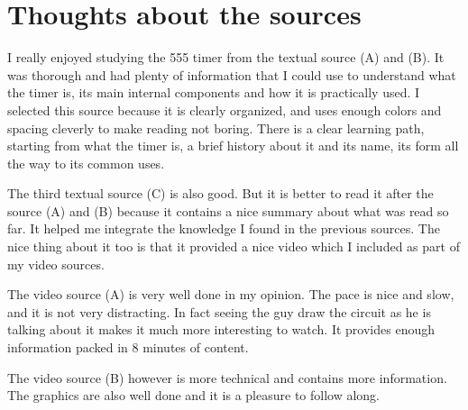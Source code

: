 \documentclass[12pt]{extarticle}
\begin{document}
\section{Thoughts about the sources}

I really enjoyed studying the 555 timer from the textual source (A) and (B). It was thorough and had plenty of information that I could use to understand what the timer is, its main internal components and how it is practically used. I selected this source because it is clearly organized, and uses enough colors and spacing cleverly to make reading not boring. There is a clear learning path, starting from what the timer is, a brief history about it and its name, its form all the way to its common uses.

The third textual source (C) is also good. But it is better to read it after the source (A) and (B) because it contains a nice summary about what was read so far. It helped me integrate the knowledge I found in the previous sources. The nice thing about it too is that it provided a nice video which I included as part of my video sources.

The video source (A) is very well done in my opinion. The pace is nice and slow, and it is not very distracting. In fact seeing the guy draw the circuit as he is talking about it makes it much more interesting to watch. It provides enough information packed in 8 minutes of content.

The video source (B) however is more technical and contains more information. The graphics are also well done and it is a pleasure to follow along.
\end{document}
